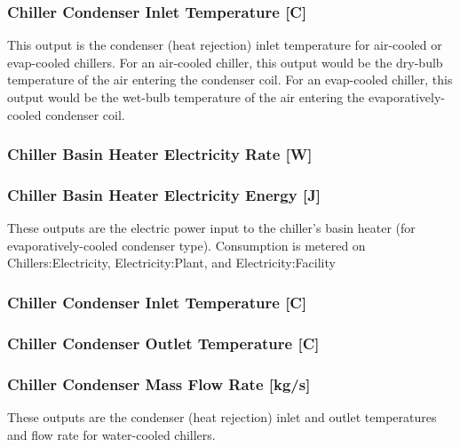 \subsubsection{Chiller Condenser Inlet Temperature {[}C{]}}\label{chiller-condenser-inlet-temperature-c}

This output is the condenser (heat rejection) inlet temperature for air-cooled or evap-cooled chillers. For an air-cooled chiller, this output would be the dry-bulb temperature of the air entering the condenser coil. For an evap-cooled chiller, this output would be the wet-bulb temperature of the air entering the evaporatively-cooled condenser coil.

\subsubsection{Chiller Basin Heater Electricity Rate {[}W{]}}\label{chiller-basin-heater-electric-power-w}

\subsubsection{Chiller Basin Heater Electricity Energy {[}J{]}}\label{chiller-basin-heater-electric-energy-j}

These outputs are the electric power input to the chiller's basin heater (for evaporatively-cooled condenser type). Consumption is metered on Chillers:Electricity, Electricity:Plant, and Electricity:Facility

\subsubsection{Chiller Condenser Inlet Temperature {[}C{]}}\label{chiller-condenser-inlet-temperature-c-1}

\subsubsection{Chiller Condenser Outlet Temperature {[}C{]}}\label{chiller-condenser-outlet-temperature-c}

\subsubsection{Chiller Condenser Mass Flow Rate {[}kg/s{]}}\label{chiller-condenser-mass-flow-rate-kgs}

These outputs are the condenser (heat rejection) inlet and outlet temperatures and flow rate for water-cooled chillers.


